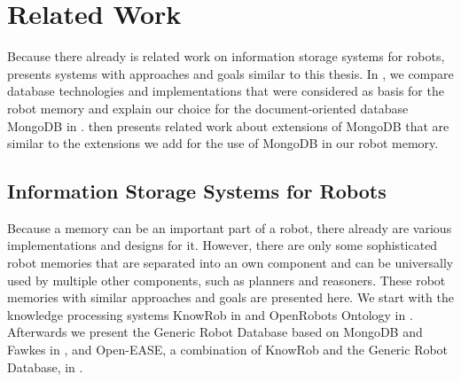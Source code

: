 \chapter{Related Work}
\label{chap:related}
Because there already is related work on information storage systems
for robots,  presents systems with approaches
and goals similar to this thesis. In , we compare
database technologies and implementations that were considered as
basis for the robot memory and explain our choice
for the document-oriented database MongoDB in
. 
then presents related work about extensions of MongoDB that are
similar to the extensions we add for the use of MongoDB in our robot
memory.

\section{Information Storage Systems for Robots}
\label{sec:rw-robmems}
Because a memory can be an important part of a robot, there already are
various implementations and designs for it. However, there are only
some sophisticated robot memories that are separated into an own
component and can be universally used by multiple other components,
such as planners and reasoners. These robot memories with similar
approaches and goals are presented here. We start with the knowledge
processing systems KnowRob in  and OpenRobots
Ontology in . Afterwards we present the Generic Robot
Database based on MongoDB and Fawkes in ,
and Open-EASE, a combination of KnowRob and the Generic Robot
Database, in .

